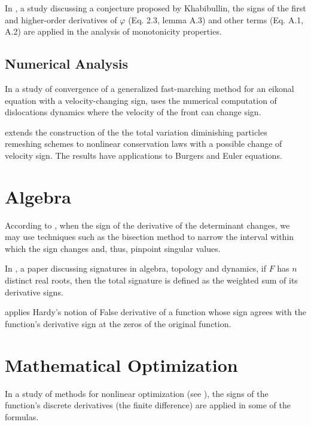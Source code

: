 \documentclass[11pt]{book}
\begin{document}
In \cite{berdellima2019note}, a study discussing a conjecture proposed by Khabibullin, the signs of the first and higher-order
derivatives of $\varphi$ (Eq. 2.3, lemma A.3) and other terms (Eq.
A.1, A.2) are applied in the analysis of monotonicity properties.


\subsection{Numerical Analysis}

In a study of convergence of a generalized fast-marching method for an eikonal
equation with a velocity-changing sign, \cite{carlini2008convergence} uses the numerical computation
of dislocations dynamics where the velocity of the front can change
sign.

\cite{weynans2013consistency} extends the construction of the the total variation diminishing
particles remeshing schemes to nonlinear conservation laws with a
possible change of velocity sign. The results have applications to Burgers and
Euler equations.


\section{Algebra}

According to \cite{kashiwagi2014derivative}, when the sign of the derivative of the determinant changes, we may use techniques such as the bisection method to narrow
the interval within which the sign changes and, thus, pinpoint singular
values.

In \cite{ghys2015signatures}, a paper discussing signatures in algebra, topology and dynamics, if $F$ has $n$ distinct real roots,
then the total signature is defined as the weighted sum of its derivative
signs.

\cite{maignan2016fleshing} applies Hardy's notion of \textquotedbl False
derivative\textquotedbl{} of a function whose sign agrees with the
function's derivative sign at the zeros of the original function.


\section{Mathematical Optimization}

In a study of methods for nonlinear optimization (see \cite{svanberg2007mma}), the signs of the function's discrete derivatives (the finite difference)
are applied in some of the formulas.
\end{document}
